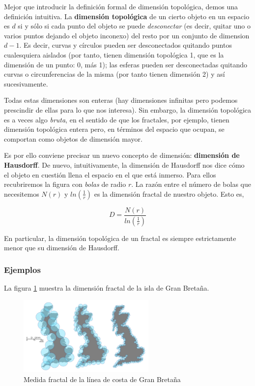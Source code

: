 Mejor que introducir la definición formal de dimensión topológica, demos una definición intuitiva. La \textbf{dimensión topológica} de un cierto objeto en un espacio es $d$ si y sólo si cada punto del objeto se puede \emph{desconectar} (es decir, quitar uno o varios puntos dejando el objeto inconexo) del resto por un conjunto de dimension $d-1$. Es decir, curvas y círculos pueden ser desconectados quitando puntos cualesquiera aislados (por tanto, tienen dimensión topológica 1, que es la dimensión de un punto: 0, más 1); las esferas pueden ser desconectadas quitando curvas o circunferencias de la misma (por tanto tienen dimensión 2) y así sucesivamente.

Todas estas dimensiones son enteras (hay dimensiones infinitas pero podemos prescindir de ellas para lo que nos interesa). Sin embargo, la dimensión topológica es a veces algo \emph{bruta}, en el sentido de que los fractales, por ejemplo, tienen dimensión topológica entera pero, en términos del espacio que ocupan, se comportan como objetos de dimensión mayor.

Es por ello conviene precisar un nuevo concepto de dimensión: \textbf{dimensión de Hausdorff}. De nuevo, intuitivamente, la dimensión de Hausdorff nos dice cómo el objeto en cuestión llena el espacio en el que está inmerso. Para ellos recubriremos la figura con \emph{bolas} de radio $r$. La razón entre el número de bolas que necesitemos $N(r)$ y $ln(\frac{1}{r})$ es la dimensión fractal de nuestro objeto. Esto es,

\begin{equation}
D = \frac{N(r)}{ln(\frac{1}{r})}
\end{equation}

En particular, la dimensión topológica de un fractal es siempre estrictamente menor que su dimensión de Hausdorff.

\subsubsection{Ejemplos}
La figura \ref{fig:gb} muestra la dimensión fractal de la isla de Gran Bretaña.
\begin{figure}[hbtp]
\centering
\includegraphics[width = 0.6\textwidth]{img/GB.png}
\caption{Medida fractal de la línea de costa de Gran Bretaña}
\label{fig:gb}
\end{figure}

